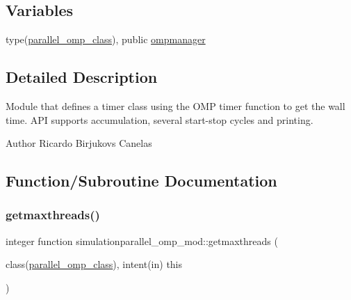 \subsection*{Variables}
\begin{DoxyCompactItemize}
\item 
type(\mbox{\hyperlink{structsimulationparallel__omp__mod_1_1parallel__omp__class}{parallel\+\_\+omp\+\_\+class}}), public \mbox{\hyperlink{namespacesimulationparallel__omp__mod_abc49bae2a6d752c9868b8b7bd233e740}{ompmanager}}
\end{DoxyCompactItemize}


\subsection{Detailed Description}
Module that defines a timer class using the O\+MP timer function to get the wall time. A\+PI supports accumulation, several start-\/stop cycles and printing. 

\begin{DoxyAuthor}{Author}
Ricardo Birjukovs Canelas 
\end{DoxyAuthor}


\subsection{Function/\+Subroutine Documentation}
\mbox{\label{namespacesimulationparallel__omp__mod_af3219ed75e38a01f71255314b2cd9eee}} 
\subsubsection{\texorpdfstring{getmaxthreads()}{getmaxthreads()}}
{\footnotesize\ttfamily integer function simulationparallel\+\_\+omp\+\_\+mod\+::getmaxthreads (\begin{DoxyParamCaption}\item[{class(\mbox{\hyperlink{structsimulationparallel__omp__mod_1_1parallel__omp__class}{parallel\+\_\+omp\+\_\+class}}), intent(in)}]{this }\end{DoxyParamCaption})\hspace{0.3cm}{\ttfamily [private]}}



